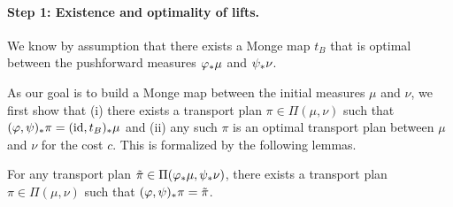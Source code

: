 \paragraph{Step 1: Existence and optimality of lifts.} We know by assumption that there exists a Monge map $t_B$ that is optimal between the pushforward measures $\varphi_*\mu$ and $\psi _*\nu$.

As our goal is to build a Monge map between the initial measures $\mu$ and $\nu$, we first show that (i) there exists a transport plan $\pi \in \Pi(\mu,\nu)$ such that $(\varphi,\psi)_*\pi = (\operatorname{id}, t_B)_*\mu$ and (ii) any such $\pi$ is an optimal transport plan between $\mu$ and $\nu$ for the cost $c$.
This is formalized by the following lemmas.

\begin{lemma}
    \label{lemma:pullback-manifold}
    For any transport plan $\tilde\pi \in \Pi(\varphi_*\mu,\psi_*\nu)$, there exists a transport plan $\pi \in \Pi(\mu,\nu)$ such that $(\varphi,\psi)_*\pi=\tilde\pi$.
\end{lemma}

